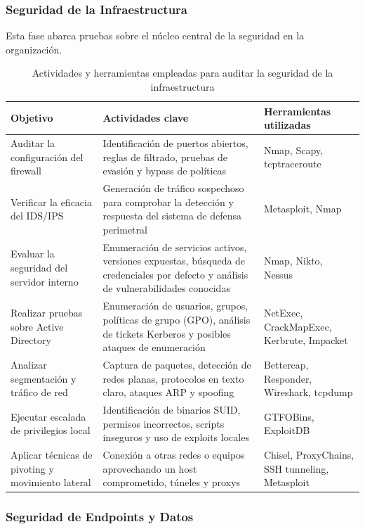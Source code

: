 \documentclass[a4paper, 11pt]{article}
\begin{document}
\subsubsection{Seguridad de la Infraestructura}

Esta fase abarca pruebas sobre el núcleo central de la seguridad en la organización.

\begin{table}[H]
\centering
\renewcommand{\arraystretch}{1.4}
\begin{tabular}{|p{4.3cm}|p{7.2cm}|p{3.6cm}|}
\hline
\textbf{Objetivo} & \textbf{Actividades clave} & \textbf{Herramientas utilizadas} \\
\hline
Auditar la configuración del firewall & Identificación de puertos abiertos, reglas de filtrado, pruebas de evasión y bypass de políticas & Nmap, Scapy, tcptraceroute \\
\hline
Verificar la eficacia del IDS/IPS & Generación de tráfico sospechoso para comprobar la detección y respuesta del sistema de defensa perimetral & Metasploit, Nmap \\
\hline
Evaluar la seguridad del servidor interno & Enumeración de servicios activos, versiones expuestas, búsqueda de credenciales por defecto y análisis de vulnerabilidades conocidas & Nmap, Nikto, Nessus \\
\hline
Realizar pruebas sobre Active Directory & Enumeración de usuarios, grupos, políticas de grupo (GPO), análisis de tickets Kerberos y posibles ataques de enumeración & NetExec, CrackMapExec, Kerbrute, Impacket \\
\hline
Analizar segmentación y tráfico de red & Captura de paquetes, detección de redes planas, protocolos en texto claro, ataques ARP y spoofing & Bettercap, Responder, Wireshark, tcpdump \\
\hline
Ejecutar escalada de privilegios local & Identificación de binarios SUID, permisos incorrectos, scripts inseguros y uso de exploits locales & GTFOBins, ExploitDB \\
\hline
Aplicar técnicas de pivoting y movimiento lateral & Conexión a otras redes o equipos aprovechando un host comprometido, túneles y proxys & Chisel, ProxyChains, SSH tunneling, Metasploit \\
\hline
\end{tabular}
\caption{Actividades y herramientas empleadas para auditar la seguridad de la infraestructura}
\label{tab:infraestructura}
\end{table}


\subsubsection{Seguridad de Endpoints y Datos}
\end{document}
